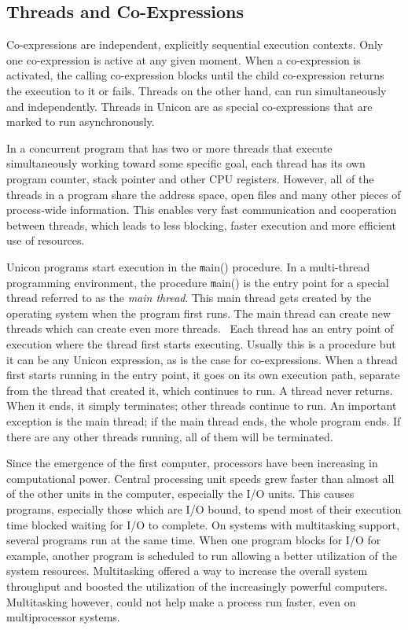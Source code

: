 \subsection[Threads and Co{}-Expressions ]{Threads and Co-Expressions}

Co-expressions are independent, explicitly sequential execution contexts.
Only one co-expression is active at any given moment. When
a co-expression is activated, the calling co-expression blocks until
the child co-expression returns the execution to it or fails. Threads
on the other hand, can run simultaneously and independently. Threads
in Unicon are as special co-expressions that are marked to run
asynchronously.

In a concurrent
program that has two or more threads that execute simultaneously
working toward some specific goal, each thread has its own program
counter, stack pointer and other CPU registers. However, all of the
threads in a program share the address space, open files and many other
pieces of process-wide information. This enables very fast
communication and cooperation between threads, which leads to less
blocking, faster execution and more efficient use of resources. 

Unicon programs start execution in the {\texttt main()} procedure. In a
multi-thread programming environment, the procedure {\texttt main()} is
the entry point for a special thread referred to as the
{\em main thread}. This main thread
gets created by the operating system when the program first runs. The
main thread can create new threads which can create even more threads.
\ Each thread has an entry point of execution where the thread first
starts executing. Usually this is a procedure but it can be any Unicon
expression, as is the case for co-expressions. When a thread first
starts running in the entry point, it goes on its own execution path,
separate from the thread that created it, which continues to run. A
thread never returns. When it ends, it simply terminates; other threads
continue to run. An important exception is the main thread; if the main
thread ends, the whole program ends. If there are any other threads
running, all of them will be terminated. 



Since the emergence of the first computer, processors have been
increasing in computational power. Central processing unit speeds grew
faster than almost all of the other units in the computer, especially
the I/O units. This causes programs, especially those which are I/O
bound, to spend most of their execution time blocked waiting for I/O to
complete. On systems with multitasking support, several programs run
at the same time. When one program blocks for I/O for example, another
program is scheduled to run allowing a better utilization of the system
resources. Multitasking offered a way to increase the overall system
throughput and boosted the utilization of the increasingly powerful
computers. Multitasking however, could not help make a process run
faster, even on multiprocessor systems.

